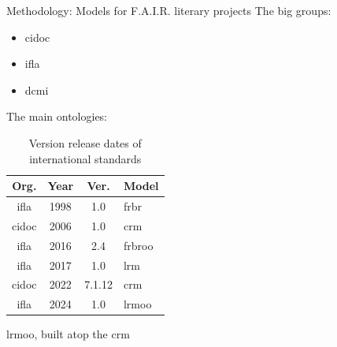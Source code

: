 \documentclass[xcolor=table]{beamer}
\begin{document}
\begin{frame}{Methodology: Models for F.A.I.R. literary projects}
    The big groups:
        \begin{itemize}
            \item \acf{cidoc}
            \item \acf{ifla}
            \item \acf{dcmi}
        \end{itemize}
    The main ontologies:
    \begin{table}
    \centering \footnotesize
        \begin{tabular}{|c|c|c|p{}|}
            \hline
            \cellcolor{gray!50}\textbf{Org.}
                & \cellcolor{gray!50}\textbf{Year}
                & \cellcolor{gray!50}\textbf{Ver.}
                & \cellcolor{gray!50}\textbf{Model}
                \\ \hline \hline
            \ac{ifla} & 1998 & 1.0 & \ac{frbr}
                \\ \hline
            \cellcolor{gray!10}\ac{cidoc}
                & \cellcolor{gray!10}2006
                & \cellcolor{gray!10}1.0
                & \cellcolor{gray!10}\ac{crm}
                \\ \hline
            \ac{ifla} & 2016 & 2.4 & \ac{frbroo}
                \\ \hline
            \cellcolor{gray!10} \ac{ifla}
                & \cellcolor{gray!10}2017
                & \cellcolor{gray!10}1.0
                & \cellcolor{gray!10}\ac{lrm}
                \\ \hline
            \ac{cidoc} & 2022 & 7.1.12 & \ac{crm}
                \\ \hline
            \cellcolor{yellow!30}\ac{ifla}
                & \cellcolor{yellow!30}2024
                & \cellcolor{yellow!30}1.0
                & \cellcolor{yellow!30}\ac{lrmoo}
                \\ \hline
        \end{tabular}
    \caption{Version release dates of international standards}
    \end{table}
\end{frame}

\begin{frame}{\acf{lrmoo}, built atop the \ac{crm}}
    \begin{adjustbox}{max totalsize={\textwidth}{0.9\textheight},center}
	
	\end{adjustbox}
\end{frame}
\end{document}
